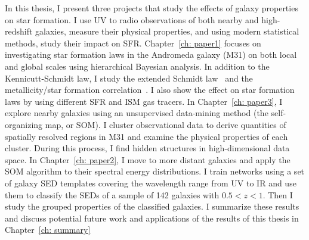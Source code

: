In this thesis, I present three projects that study the effects of galaxy properties on star formation.
I use UV to radio observations of both nearby and high-redshift galaxies, measure their physical properties, and using modern statistical methods, study their impact on SFR.
Chapter~\ref{ch: paper1} focuses on investigating star formation laws in the Andromeda galaxy (M31) on both local and global scales using hierarchical Bayesian analysis.
In addition to the Kennicutt-Schmidt law, I study the extended Schmidt law~\citep{Shi11} and the metallicity/star formation correlation~\citep{Krumholz09}.
I also show the effect on star formation laws by using different SFR and ISM gas tracers.
In Chapter~\ref{ch: paper3}, I explore nearby galaxies using an unsupervised data-mining method (the self-organizing map, or SOM).
I cluster observational data to derive quantities of spatially resolved regions in M31 and examine the physical properties of each cluster.
During this process, I find hidden structures in high-dimensional data space.
In Chapter~\ref{ch: paper2}, I move to more distant galaxies and apply the SOM algorithm to their spectral energy distributions.
I train networks using a set of galaxy SED templates covering the wavelength range from UV to IR and use them to classify the SEDs of a sample of 142 galaxies with $0.5 < z < 1$. 
Then I study the grouped properties of the classified galaxies.
I summarize these results and discuss potential future work and applications of the results of this thesis in Chapter~\ref{ch: summary}

 
